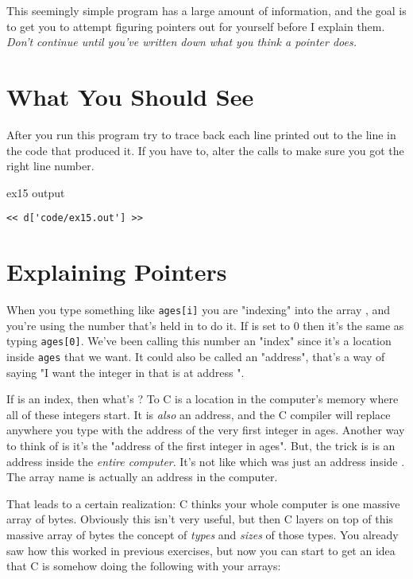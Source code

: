 This seemingly simple program has a large amount of information, and the
goal is to get you to attempt figuring pointers out for yourself before
I explain them.  \emph{Don't continue until you've written down what
you think a pointer does.}


\section{What You Should See}

After you run this program try to trace back each line printed out to the
line in the code that produced it.  If you have to, alter the 
calls to make sure you got the right line number.

\begin{code}{ex15 output}
\begin{lstlisting}
<< d['code/ex15.out'] >>
\end{lstlisting}
\end{code}


\section{Explaining Pointers}

When you type something like \verb|ages[i]| you are "indexing" into the array
, and you're using the number that's held in  to do it.
If  is set to 0 then it's the same as typing \verb|ages[0]|.  We've
been calling this number  an "index" since it's a location inside
\verb|ages| that we want.  It could also be called an "address", that's a way
of saying "I want the integer in  that is at address ".

If  is an index, then what's ?  To C  is a
location in the computer's memory where all of these integers start.  It is
\emph{also} an address, and the C compiler will replace anywhere you type
 with the address of the very first integer in ages.  Another way
to think of  is it's the "address of the first integer in
ages".  But, the trick is  is an address inside the \emph{entire
computer}.  It's not like  which was just an address inside
.  The  array name is actually an address in the
computer.

That leads to a certain realization:  C thinks your whole computer is one
massive array of bytes.  Obviously this isn't very useful, but then C layers on
top of this massive array of bytes the concept of \emph{types} and \emph{sizes}
of those types.  You already saw how this worked in previous exercises, but now
you can start to get an idea that C is somehow doing the following with your
arrays:

